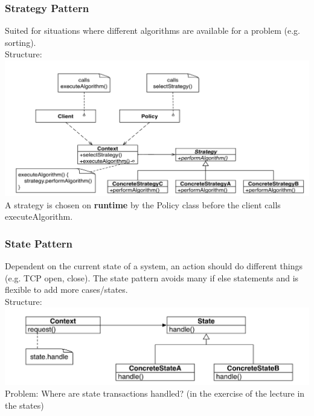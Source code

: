 \subsubsection{Strategy Pattern}
Suited for situations where different algorithms are available for a problem (e.g. sorting).\\
Structure:\\
\includegraphics[width=\linewidth]{images/pattern_strategy.png}
A strategy is chosen on \textbf{runtime} by the Policy class before the client calls executeAlgorithm.
\newpage

\subsubsection{State Pattern}
Dependent on the current state of a system, an action should do different things (e.g. TCP open, close).
The state pattern avoids many if else statements and is flexible to add more cases/states.\\
Structure:\\
\includegraphics[width=\linewidth]{images/pattern_state.png}
Problem: Where are state transactions handled? (in the exercise of the lecture in the states)
\newpage

